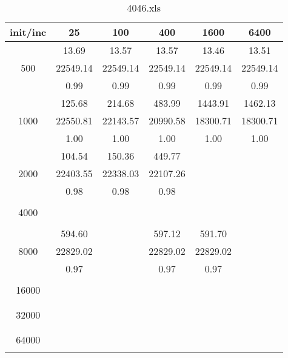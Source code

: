 \begin{table}[th]
\caption{4046.xls}
\label{tab:4046.xls}
\centering
\begin{tabular}{|c||c|c|c|c|c|}
\hline
init/inc & 25 & 100 & 400 & 1600 & 6400 \\ \hline \hline
  & 13.69 & 13.57 & 13.57 & 13.46 & 13.51\\ 
500  & 22549.14 & 22549.14 & 22549.14 & 22549.14 & 22549.14\\ 
  & 0.99 & 0.99 & 0.99 & 0.99 & 0.99\\ \hline 
  & 125.68 & 214.68 & 483.99 & 1443.91 & 1462.13\\ 
1000  & 22550.81 & 22143.57 & 20990.58 & 18300.71 & 18300.71\\ 
  & 1.00 & 1.00 & 1.00 & 1.00 & 1.00\\ \hline 
  & 104.54 & 150.36 & 449.77 &  & \\ 
2000  & 22403.55 & 22338.03 & 22107.26 &  & \\ 
  & 0.98 & 0.98 & 0.98 &  & \\ \hline 
  &  &  &  &  & \\ 
4000  &  &  &  &  & \\ 
  &  &  &  &  & \\ \hline 
  & 594.60 &  & 597.12 & 591.70 & \\ 
8000  & 22829.02 &  & 22829.02 & 22829.02 & \\ 
  & 0.97 &  & 0.97 & 0.97 & \\ \hline 
  &  &  &  &  & \\ 
16000  &  &  &  &  & \\ 
  &  &  &  &  & \\ \hline 
  &  &  &  &  & \\ 
32000  &  &  &  &  & \\ 
  &  &  &  &  & \\ \hline 
  &  &  &  &  & \\ 
64000  &  &  &  &  & \\ 
  &  &  &  &  & \\ \hline 
\end{tabular}
\end{table}

\cleardoublepage

